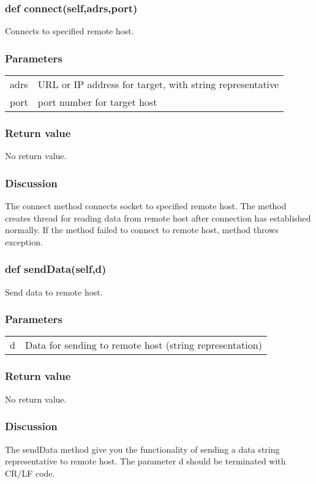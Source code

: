 \documentclass[a4paper,10pt]{jsarticle}
\begin{document}
\subsubsection{def connect(self,adrs,port)}
Connects to specified remote host.

\subsubsection*{Parameters}
\begin{tabular}{ll}
adrs	&URL or IP address for target, with string representative\\
port	&port number for target host
\end{tabular}

\subsubsection*{Return value}
No return value.

\subsubsection*{Discussion}
The connect method connects socket to specified remote host.
The method creates thread for reading data from remote host after connection has established normally.
If the method failed to connect to remote host, method throws exception.


\subsubsection{def sendData(self,d)}
Send data to remote host.

\subsubsection*{Parameters}
\begin{tabular}{ll}
d	&Data for sending to remote host (string representation)
\end{tabular}

\subsubsection*{Return value}
No return value.

\subsubsection*{Discussion}
The sendData method give you the functionality of sending a data string representative to remote host.
The parameter d should be terminated with CR/LF code.
\end{document}
